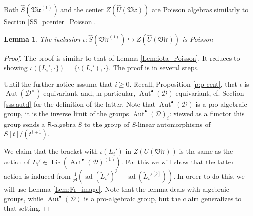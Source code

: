 \documentclass{amsart}
\newtheorem{Lem}[Thm]{Lemma}
\theoremstyle{definition}
\newcommand{\D}{\sD}
\newcommand{\sD}{\mathscr{D}}
\newcommand{\on}{\mathrm}
\newcommand{\Ring}{\mathsf{R}}
\newcommand{\Z}{\mathbb{Z}}
\newcommand{\Aut}{\on{Aut}}
\numberwithin{equation}{section}
\begin{document}
Both $\widehat{S}(\mathfrak{Vir}^{(1)})$ and the center $Z(\widehat{U}(\mathfrak{Vir}))$
are Poisson algebras similarly to Section \ref{SS_pcenter_Poisson}. 

\begin{Lem}\label{Lem:restricted_Vir}
The inclusion $\iota:\widehat{S}(\mathfrak{Vir}^{(1)})\hookrightarrow Z(\widehat{U}(\mathfrak{Vir}))$ is Poisson.
\end{Lem}
\begin{proof}
The proof is similar to that of Lemma \ref{Lem:iota_Poisson}. It reduces to showing $\iota(\{L_i',\cdot\})=\{\iota(L_i'),\cdot\}$. The proof is in several steps. 

Until the further notice assume that $i\geqslant 0$. 
Recall, Proposition \ref{p:p-cent}, that $\iota$ is $\operatorname{Aut}(\D^\times)$-equivariant, and, in particular, $\operatorname{Aut}^\bullet(\D)$-equivariant, { cf. Section \ref{sss:autd} for the definition of the latter.%
} 
Note that $\operatorname{Aut}^\bullet(\D)$
is a pro-algebraic group, it is the inverse limit of the groups $\operatorname{Aut}^\bullet(\D)_i$: viewed as a functor this group sends a $\Ring$-algebra $S$ to the group of $S$-linear automorphisms of $S[t]/(t^{i+1})$.

We claim that the bracket with $\iota(L_i')$
in $Z(U(\mathfrak{Vir}))$ is the same as the action of $L_i'\in \operatorname{Lie}(\operatorname{Aut}^\bullet(\D)^{(1)})$. For this we will show that the latter action is induced from $\frac{1}{p!}(\operatorname{ad}(\breve{L}_i')^p-\operatorname{ad}(\breve{L}_i'^{[p]}))$. In order to do this, we will use Lemma \ref{Lem:Fr_image}. Note that the lemma deals with algebraic groups, while $\operatorname{Aut}^\bullet(\D)$ is a pro-algebraic group, but the claim generalizes to that setting. 



\end{proof}
\end{document}
